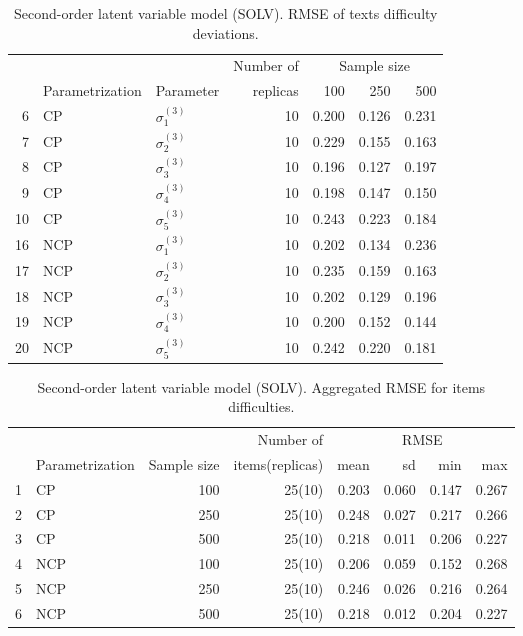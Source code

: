 \begin{table}[H]
	\centering
	\begin{tabular}{rllrrrr}
		\hline
		\multicolumn{3}{c}{ } & Number of &\multicolumn{3}{c}{ Sample size } \\ 
		\cmidrule(rl){5-7}
		& Parametrization & Parameter & replicas & 100 & 250 & 500 \\  
		\hline\hline
		6 & CP & $\sigma^{(3)}_{1}$ &   10 & 0.200 & 0.126 & 0.231 \\ 
		7 & CP & $\sigma^{(3)}_{2}$ &   10 & 0.229 & 0.155 & 0.163 \\ 
		8 & CP & $\sigma^{(3)}_{3}$ &   10 & 0.196 & 0.127 & 0.197 \\ 
		9 & CP & $\sigma^{(3)}_{4}$ &   10 & 0.198 & 0.147 & 0.150 \\ 
		10 & CP & $\sigma^{(3)}_{5}$ &   10 & 0.243 & 0.223 & 0.184 \\ 
		\hline
		16 & NCP & $\sigma^{(3)}_{1}$ &   10 & 0.202 & 0.134 & 0.236 \\ 
		17 & NCP & $\sigma^{(3)}_{2}$ &   10 & 0.235 & 0.159 & 0.163 \\ 
		18 & NCP & $\sigma^{(3)}_{3}$ &   10 & 0.202 & 0.129 & 0.196 \\ 
		19 & NCP & $\sigma^{(3)}_{4}$ &   10 & 0.200 & 0.152 & 0.144 \\ 
		20 & NCP & $\sigma^{(3)}_{5}$ &   10 & 0.242 & 0.220 & 0.181 \\ 
		\hline
	\end{tabular}
	\caption[Second-order latent variable model (SOLV). RMSE of texts difficulty deviations.]%
	{Second-order latent variable model (SOLV). RMSE of texts difficulty deviations.}
	\label{tab:SOLV_RMSE_texts_dev}
\end{table}
%
\begin{table}[ht]
	\centering
	\begin{tabular}{rlrrrrrr}
		\hline
		\multicolumn{3}{c}{ } & Number of &\multicolumn{4}{c}{ RMSE } \\ 
		\cmidrule(rl){5-8}
		& Parametrization & Sample size & items(replicas) & mean & sd & min & max \\  
		\hline\hline
		1 & CP &  100 & 25(10) & 0.203 & 0.060 & 0.147 & 0.267 \\ 
		2 & CP &  250 & 25(10) & 0.248 & 0.027 & 0.217 & 0.266 \\
		3 & CP &  500 & 25(10) & 0.218 & 0.011 & 0.206 & 0.227 \\  
		\hline
		4 & NCP &  100 & 25(10) & 0.206 & 0.059 & 0.152 & 0.268 \\ 
		5 & NCP &  250 & 25(10) & 0.246 & 0.026 & 0.216 & 0.264 \\
		6 & NCP &  500 & 25(10) & 0.218 & 0.012 & 0.204 & 0.227 \\ 
		\hline
	\end{tabular}
	\caption[Second-order latent variable model (SOLV). Aggregated RMSE for items difficulties.]%
	{Second-order latent variable model (SOLV). Aggregated RMSE for items difficulties.}
	\label{tab:SOLV_RMSE_items}
\end{table}